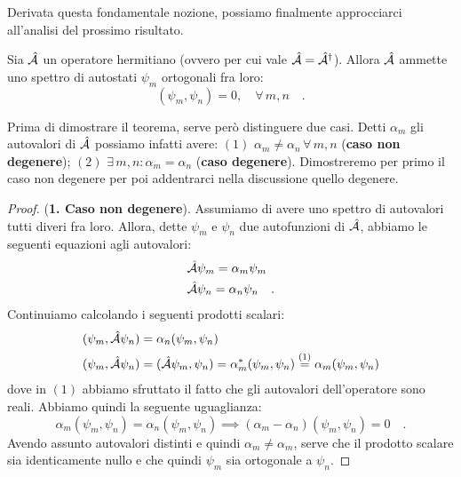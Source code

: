 Derivata questa fondamentale nozione, possiamo finalmente approcciarci all'analisi del prossimo risultato. 
\begin{teorema}
    Sia $\hat{\mathcal{A}}$ un operatore hermitiano (ovvero per cui vale $\hat{\mathcal{A}} = \hat{\mathcal{A}}^\dagger$). Allora $\hat{\mathcal{A}}$ ammette uno spettro di autostati $\psi_m$ ortogonali fra loro: 
    \[
        (\psi_m,\psi_n) = 0, \quad \forall \, m,n \quad.
    \]
\end{teorema}
Prima di dimostrare il teorema, serve però distinguere due casi. Detti $\alpha_m$ gli autovalori di $\hat{\mathcal{A}}$ possiamo infatti avere: $(1)$ $\alpha_m \neq \alpha_n \, \forall\,  m,n$ (\textbf{caso non degenere}); $(2)$ $\exists \, m,n : \alpha_m = \alpha_n$ (\textbf{caso degenere}). Dimostreremo per primo il caso non degenere per poi addentrarci nella discussione quello degenere.

\begin{proof}
    (\textbf{1. Caso non degenere}). Assumiamo di avere uno spettro di autovalori tutti diveri fra loro. Allora, dette $\psi_m$ e $\psi_n$ due autofunzioni di $\hat{\mathcal{A}}$, abbiamo le seguenti equazioni agli autovalori:
    \[
        \begin{aligned}
            &\hat{\mathcal{A}} \psi_m = \alpha_m\psi_m \\
            &\hat{\mathcal{A}} \psi_n = \alpha_n\psi_n \quad.
        \end{aligned}
    \]
    Continuiamo calcolando i seguenti prodotti scalari:
    \[
    \begin{aligned}
        &(\psi_m, \hat{\mathcal{A}}\psi_n) = \alpha_n (\psi_m,\psi_n) \\
        &(\psi_m, \hat{\mathcal{A}}\psi_n) = (\hat{\mathcal{A}}\psi_m, \psi_n) = \alpha_m^*(\psi_m, \psi_n) \overset{(1)}{=} \alpha_m(\psi_m, \psi_n)
    \end{aligned}
    \]
    dove in $(1)$ abbiamo sfruttato il fatto che gli autovalori dell'operatore sono reali. Abbiamo quindi la seguente uguaglianza:
    \[
        \alpha_m(\psi_m, \psi_n) = \alpha_n(\psi_m, \psi_n) \implies (\alpha_m - \alpha_n) (\psi_m, \psi_n) = 0 \quad.
    \]  
    Avendo assunto autovalori distinti e quindi $\alpha_m \neq \alpha_m$, serve che il prodotto scalare sia identicamente nullo e che quindi $\psi_m$ sia ortogonale a $\psi_n$.  
\end{proof}

